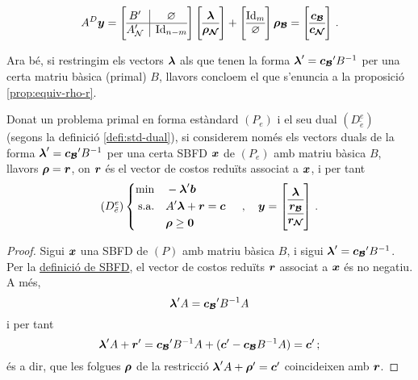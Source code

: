 \begin{equation}\label{eq:partition2}
	A^D\vb{y} = \left[\begin{array}{{@{}c|c@{}}}
		B'	  &	\varnothing	\\
		\hline
		A_\N' & \Id_{n-m}
	\end{array}\right]
	\left[\begin{array}{{@{}c@{}}}
			\vb{\lambda}\\
			\hline
			\vb{\rho_\N}
		\end{array}\right]
	+
	\left[\begin{array}{{@{}c@{}}}
		\Id_m\\
		\hline
		\varnothing
	\end{array}\right]
	\vb{\rho_\B}
	=
	\left[\begin{array}{{@{}c@{}}}
	\vb{c_\B}\\
	\hline
	\vb{c_\N}
	\end{array}\right]\,.
\end{equation}

Ara bé, si restringim els vectors $\boldsymbol{\lambda}$ als que tenen la forma $\boldsymbol{\lambda}'=\boldsymbol{c_{\mathcal{B}}}'B^{-1}$ per una certa matriu bàsica (primal) $B$, llavors concloem el que s'enuncia a la proposició \ref{prop:equiv-rho-r}.


\begin{prop}\label{prop:equiv-rho-r}
	Donat un problema primal en forma estàndard $(P_e)$ i el seu dual $(D^e_{\tilde{e}})$ (segons la definició \ref{defi:std-dual}), si considerem només els vectors duals de la forma $\boldsymbol{\lambda}'=\boldsymbol{c_{\mathcal{B}}}'B^{-1}$ per una certa SBFD  $\boldsymbol{x}$ de $(P_e)$ amb matriu bàsica $B$, llavors $\boldsymbol{\rho} = \boldsymbol{r}$, on $\boldsymbol{r}$ és el vector de costos reduïts associat a $\boldsymbol{x}$, i per tant
	\[
		(D^e_{\tilde{e}})
		\begin{cases}
		\begin{aligned}
			\min 			&&& -\vb{\lambda}'\vb{b}\\
			\text{s.a.}		&&& A'\vb{\lambda} +  \vb{r} = \vb{c}\\
			&&& \vb{\rho} \ge \vb{0}
		\end{aligned}
		\end{cases}\,, 
		\quad \vb{y} =
		\left[
		\begin{array}{@{}c@{}}
			\vb{\lambda}\\
			\hline
			\vb{r_\B}\\
			\hline
			\vb{r_\N}
		\end{array}
		\right]\,.
	\]
	
	\begin{proof}
		Sigui $\boldsymbol{x}$ una SBFD de $(P)$ amb matriu bàsica $B$, i sigui $\boldsymbol{\lambda}' = \boldsymbol{c_{\mathcal{B}}}'B^{-1}$. Per la \hyperref[defi:SBFD]{definició de SBFD}, el vector de costos reduïts $\boldsymbol{r}$ associat a $\boldsymbol{x}$ és no negatiu. A més,
		\[
			\boldsymbol{\lambda}'A = \boldsymbol{c_{\mathcal{B}}}'B^{-1}A
		\] 
		i per tant
		\[
			\boldsymbol{\lambda}'A + \boldsymbol{r}' = \boldsymbol{c_{\mathcal{B}}}'B^{-1}A + (\boldsymbol{c}' - \boldsymbol{c_{\mathcal{B}}}B^{-1}A) = \boldsymbol{c}'\,;
		\]
		és a dir, que les folgues $\boldsymbol{\rho}$ de la restricció $\boldsymbol{\lambda}'A +  \boldsymbol{\rho}' = \boldsymbol{c}'$ coincideixen amb $\boldsymbol{r}$.
	\end{proof}
\end{prop}

